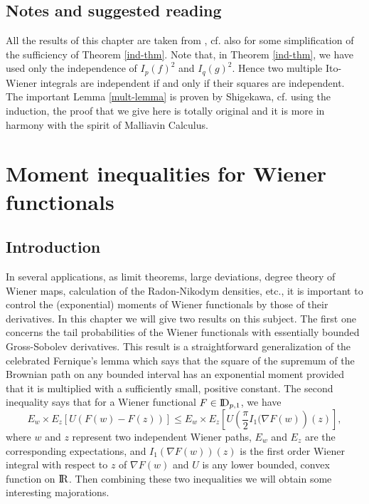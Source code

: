 \documentclass[12pt,a4paper]{book}
\newcommand{\DD}{{\rm I\!D}}
\newcommand{\R}{{\rm I\!R}}
\begin{document}
\section*{Notes and suggested reading}
{\footnotesize{All the results of this chapter are taken from
    \cite{UZ1,UZ2}, cf. also \cite{OK} for some simplification of the
    sufficiency of Theorem \ref{ind-thm}. Note that, in Theorem
    \ref{ind-thm}, we have used only the independence of $I_p(f)^2$
    and $I_q(g)^2$. Hence two multiple Ito-Wiener integrals are
    independent if and only if their squares are independent. The
    important Lemma \ref{mult-lemma} is proven by Shigekawa,
    cf. \cite{Sh} using the induction, the proof that we give here is
    totally original and it is more in harmony with the spirit of
    Malliavin Calculus.

}}








\chapter{Moment inequalities for Wiener functionals}
\label{ch.ineq}

\section*{Introduction}
In several applications, as limit theorems, large deviations, degree
theory of Wiener maps, calculation of the Radon-Nikodym densities,
etc., it is
important to control the (exponential) moments of Wiener functionals by those
of their derivatives. In this chapter we will give two  results on this
subject. The first one concerns the tail probabilities of the Wiener
functionals with essentially bounded Gross-Sobolev derivatives. This
result is a straightforward generalization of the celebrated
Fernique's lemma which says that the square of the  supremum of the
Brownian path on any bounded interval has an exponential moment
provided that it is multiplied with a sufficiently small, positive
constant. The second inequality says that for a Wiener functional
$F\in \DD_{p,1}$, we have
\begin{equation}
E_w\times E_z[U(F(w)-F(z))]\leq E_w\times
              E_z\left[U\left(\frac{\pi}{2}I_1(\nabla F(w)\right)(z)\right],
\end{equation}
where $w$ and $z$ represent two independent Wiener paths, $E_w$ and
$E_z$ are the corresponding expectations, and $I_1(\nabla F(w))(z)$ is
the first order Wiener integral with respect to $z$ of $\nabla F(w)$
and $U$ is any lower bounded, convex function on $\R$.
 Then combining  these two inequalities  we will obtain some interesting
majorations.
\end{document}
